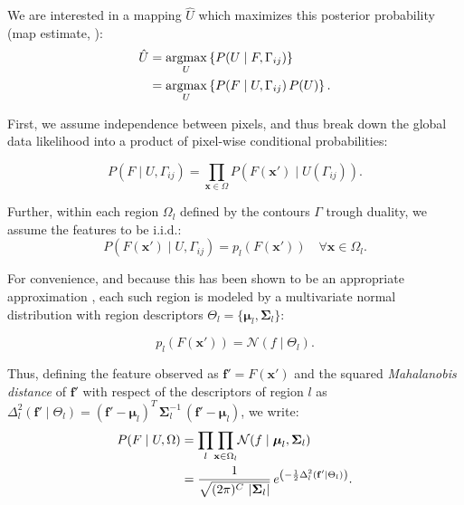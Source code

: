 We are interested in a mapping $\hat{U}$ which maximizes this
posterior probability (\gls*{map} estimate, \citep{bishop_pattern_2006}):
\begin{align}
\hat{U} &= \underset{U}{\argmax} \left\{ P(U \mid F,\Gamma_{ij}) \right\} \notag\\
 &= \underset{U}{\argmax} \left\{ P(F \mid U,\Gamma_{ij})\, P(U) \right\}.
\label{eq:map_u}
\end{align}

First, we assume independence between pixels, and thus break down the
global data likelihood into a product of pixel-wise conditional probabilities:

\begin{equation}
P(F \mid U,\Gamma_{ij}) = 
\underset{\mathbf{x}\in \Omega}{\prod} P\left( F(\mathbf{x}') \mid U(\Gamma_{ij}) \right).
\label{eq:bayes_aposteriori}
\end{equation}

Further, within each region $\Omega_l$ defined by the contours $\Gamma$
trough duality, we assume the features to be i.i.d.:
\begin{equation}
P\left( F(\mathbf{x}') \mid U,\Gamma_{ij} \right) = p_l( F(\mathbf{x}')) \quad
\forall \mathbf{x} \in \Omega_l.
\label{eq:likelihood}
\end{equation}

For convenience, and because this has been shown to be an appropriate
approximation \citep{bishop_pattern_2006}, each such region is modeled
by a multivariate normal distribution with region descriptors
$\Theta_l = \lbrace \boldsymbol{\mu}_l, \boldsymbol{\Sigma}_{l} \rbrace$:

\begin{equation}
p_l( F(\mathbf{x}') ) = \mathcal{N} ( f \mid \Theta_l ).
\label{eq:multivariate_normal}
\end{equation}

Thus, defining the feature observed as $\mathbf{f}'=F(\mathbf{x}')$ and 
the squared \emph{Mahalanobis distance} of $\mathbf{f}'$ with respect
of the descriptors of region $l$ as
$\Delta^2_l (\mathbf{f}' \mid \Theta_l ) = (\mathbf{f}' - \boldsymbol{\mu}_l)^T \, \boldsymbol{\Sigma}^{-1}_l \, (\mathbf{f}' - \boldsymbol{\mu}_l)$,
we write:
\begin{align}
P( F \mid U, \Omega ) &= \underset{l}{\prod} \underset{\mathbf{x} \in \Omega_l}{\prod}
\mathcal{N} ( f \mid \boldsymbol{\mu}_l, \boldsymbol{\Sigma}_{l} ) \notag\\
&= \frac{1}{ \sqrt{(2\pi)^{C}\,\left|\boldsymbol{\Sigma}_{l}\right|}}\,{e^{\left(-\frac{1}{2}  \Delta^2_l (\mathbf{f}' \mid \Theta_l ) \right)}}.
\label{eq:pdf}
\end{align}

